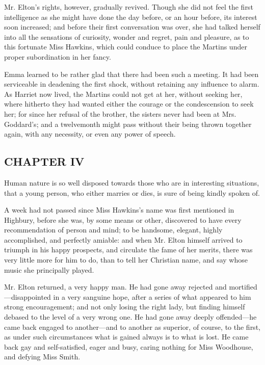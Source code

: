 Mr. Elton's rights, however, gradually revived. Though she did not feel the first intelligence as she might have done the day before, or an hour before, its interest soon increased; and before their first conversation was over, she had talked herself into all the sensations of curiosity, wonder and regret, pain and pleasure, as to this fortunate Miss Hawkins, which could conduce to place the Martins under proper subordination in her fancy.

Emma learned to be rather glad that there had been such a meeting. It had been serviceable in deadening the first shock, without retaining any influence to alarm. As Harriet now lived, the Martins could not get at her, without seeking her, where hitherto they had wanted either the courage or the condescension to seek her; for since her refusal of the brother, the sisters never had been at Mrs. Goddard's; and a twelvemonth might pass without their being thrown together again, with any necessity, or even any power of speech.

\subsection[chapter-iv-1]{\useURL[url23][][][]\from[url23]CHAPTER IV}

Human nature is so well disposed towards those who are in interesting situations, that a young person, who either marries or dies, is sure of being kindly spoken of.

A week had not passed since Miss Hawkins's name was first mentioned in Highbury, before she was, by some means or other, discovered to have every recommendation of person and mind; to be handsome, elegant, highly accomplished, and perfectly amiable: and when Mr. Elton himself arrived to triumph in his happy prospects, and circulate the fame of her merits, there was very little more for him to do, than to tell her Christian name, and say whose music she principally played.

Mr. Elton returned, a very happy man. He had gone away rejected and mortified---disappointed in a very sanguine hope, after a series of what appeared to him strong encouragement; and not only losing the right lady, but finding himself debased to the level of a very wrong one. He had gone away deeply offended---he came back engaged to another---and to another as superior, of course, to the first, as under such circumstances what is gained always is to what is lost. He came back gay and self-satisfied, eager and busy, caring nothing for Miss Woodhouse, and defying Miss Smith.

